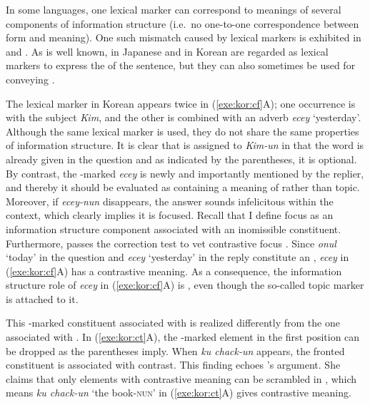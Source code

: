 In some languages, one lexical marker can correspond to meanings of
several components of information structure (i.e.\ no one-to-one
correspondence between form and meaning).  One such mismatch caused by
lexical markers is exhibited in  and . As is
well known, \wa in Japanese and \nun in Korean are regarded as lexical
markers to express the  of the sentence, but they can also
sometimes be used for conveying .





\noindent The lexical marker \nun in Korean appears twice in
(\ref{exe:kor:cf}A); one occurrence is with the subject \textit{Kim},
and the other is combined with an adverb \textit{ecey}
`yesterday'. Although the same lexical marker is used, they do not share the same properties of information
structure. It is clear that  is assigned to \textit{Kim-un} in
that the word is already given in the question and as indicated by the
parentheses, it is optional. By contrast, the \onun-marked
\textit{ecey} is newly and importantly mentioned by the replier, and
thereby it should be evaluated as containing a meaning of  rather
than topic. Moreover, if \textit{ecey-nun} disappears, the answer
sounds infelicitous within the context, which clearly implies it is
focused. Recall that I define focus as an information structure
component associated with an inomissible constituent.  Furthermore,
 passes the correction test to vet contrastive focus
\citep{gryllia:09}. Since \textit{onul} `today' in
the question and \textit{ecey} `yesterday' in the reply constitute an
, \textit{ecey} in (\ref{exe:kor:cf}A) has a
contrastive meaning.  As a consequence, the information structure role
of \textit{ecey} in (\ref{exe:kor:cf}A) is , even
though the so-called topic marker \nun is attached to it.



This \onun-marked constituent associated with 
is realized differently from the one associated with . In (\ref{exe:kor:ct}A), the \onun-marked element in the first
position can be dropped as the parentheses imply. When \textit{ku
  chack-un} appears, the fronted constituent is associated with
contrast.  This finding echoes \citeauthor{choi:99}'s argument. She
claims that only elements with contrastive meaning can be scrambled in
, which means \textit{ku chack-un} `the book-\textsc{nun}'
in (\ref{exe:kor:ct}A) gives contrastive meaning.

